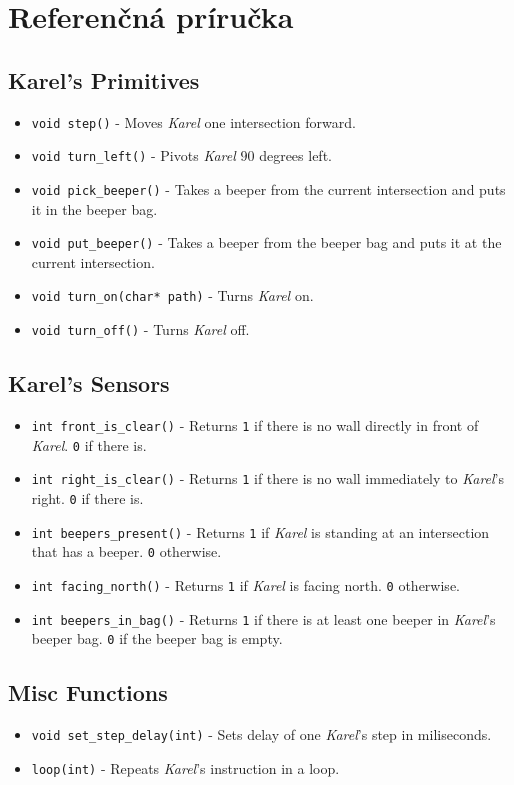 
\chapter{Referenčná príručka}
\label{appendix:reference}


\section*{Karel's Primitives}

\begin{itemize}
    \item \verb|void step()| - Moves \textit{Karel} one intersection forward.
    \item \verb|void turn_left()| - Pivots \textit{Karel} $90$ degrees left.
    \item \verb|void pick_beeper()| - Takes a beeper from the current intersection and puts it in the beeper bag.
    \item \verb|void put_beeper()| - Takes a beeper from the beeper bag and puts it at the current intersection.
    \item \verb|void turn_on(char* path)| - Turns \textit{Karel} on.
    \item \verb|void turn_off()| - Turns \textit{Karel} off.
\end{itemize}


\section*{Karel's Sensors}

\begin{itemize}
    \item \verb|int front_is_clear()| - Returns \texttt{1} if there is no wall directly in front of \textit{Karel}. \texttt{0} if there is.
    \item \verb|int right_is_clear()| - Returns \texttt{1} if there is no wall immediately to \textit{Karel}'s right. \texttt{0} if there is.
    \item \verb|int beepers_present()| - Returns \texttt{1} if \textit{Karel} is standing at an intersection that has a beeper. \texttt{0} otherwise.
    \item \verb|int facing_north()| - Returns \texttt{1} if \textit{Karel} is facing north. \texttt{0} otherwise.
    \item \verb|int beepers_in_bag()| - Returns \texttt{1} if there is at least one beeper in \textit{Karel}'s beeper bag. \texttt{0} if the beeper bag is empty.
\end{itemize}


\section*{Misc Functions}

\begin{itemize}
    \item \verb|void set_step_delay(int)| - Sets delay of one \textit{Karel}'s step in miliseconds.
    \item \verb|loop(int)| - Repeats \textit{Karel}'s instruction in a loop.
\end{itemize}
